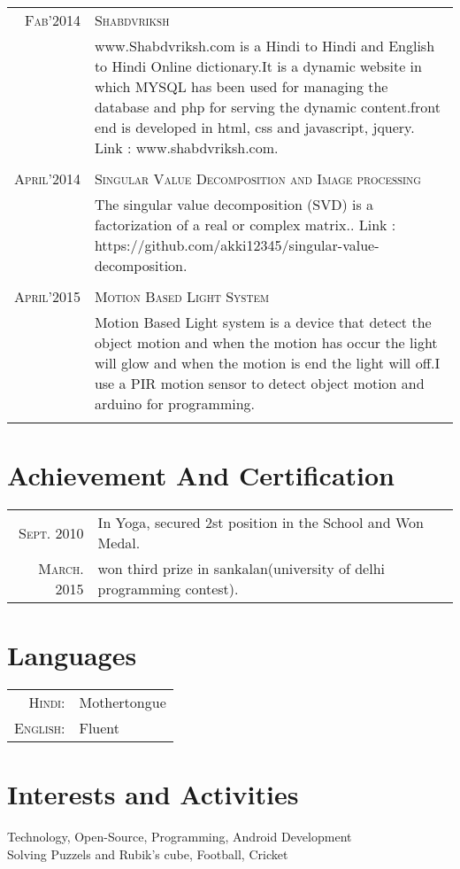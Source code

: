 \documentclass[a4paper,10pt]{article}
\begin{document}
\begin{tabular}{r|p{11cm}}
\textsc{Fab'2014} & \textsc{Shabdvriksh}\\&\footnotesize{www.Shabdvriksh.com is a Hindi to Hindi and English to Hindi Online dictionary.It is a dynamic website in which MYSQL has been used for managing the database and php for serving the dynamic content.front end is developed in html, css and javascript, jquery. 
Link : www.shabdvriksh.com.}\\\\
\textsc{April'2014} & \textsc{Singular Value Decomposition and Image processing }\\&\footnotesize{The singular value decomposition (SVD) is a factorization of a real or complex matrix.. 
Link : https://github.com/akki12345/singular-value-decomposition.}\\\\
\textsc{April'2015} & \textsc{Motion Based Light System}\\&\footnotesize{Motion Based Light system is a device that detect the object motion and when the motion has occur the light will glow and when the motion is end the light will off.I use a PIR motion sensor to detect object motion and arduino for programming.}\\\\
\end{tabular}

\section{Achievement And Certification }
\begin{tabular}{rl}
 \textsc{Sept.} 2010 & In Yoga, secured 2st position in the School and Won Medal.\normalsize\\
 \textsc{March.} 2015 & won third prize in sankalan(university of delhi programming contest).\normalsize\\
\end{tabular}

\section{Languages}
\begin{tabular}{rl}
 \textsc{Hindi:}&Mothertongue\\
\textsc{English:}&Fluent\\
\end{tabular}

\section{Interests and Activities}
Technology, Open-Source, Programming, Android Development\\
Solving Puzzels and Rubik's cube, Football, Cricket

\end{document}
